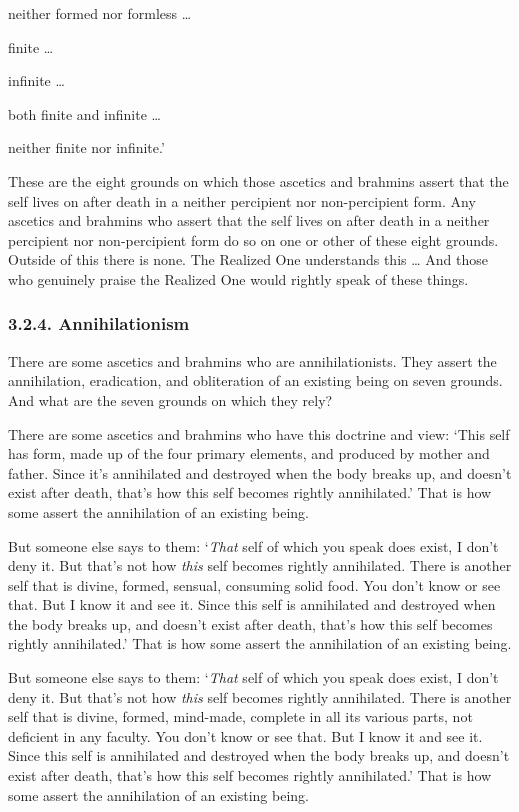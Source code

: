 \documentclass[12pt,openany]{book}%
\begin{document}
neither formed nor formless … 

finite … 

infinite … 

both finite and infinite … 

neither finite nor infinite.’ 

These are the eight grounds on which those ascetics and brahmins assert that the self lives on after death in a neither percipient nor non-percipient form. Any ascetics and brahmins who assert that the self lives on after death in a neither percipient nor non-percipient form do so on one or other of these eight grounds. Outside of this there is none. The Realized One understands this … And those who genuinely praise the Realized One would rightly speak of these things. 

\subsubsection*{3.2.4. Annihilationism }

There are some ascetics and brahmins who are annihilationists. They assert the annihilation, eradication, and obliteration of an existing being on seven grounds. And what are the seven grounds on which they rely? 

There are some ascetics and brahmins who have this doctrine and view: ‘This self has form, made up of the four primary elements, and produced by mother and father. Since it’s annihilated and destroyed when the body breaks up, and doesn’t exist after death, that’s how this self becomes rightly annihilated.’ That is how some assert the annihilation of an existing being. 

But someone else says to them: ‘\emph{That} self of which you speak does exist, I don’t deny it. But that’s not how \emph{this} self becomes rightly annihilated. There is another self that is divine, formed, sensual, consuming solid food. You don’t know or see that. But I know it and see it. Since this self is annihilated and destroyed when the body breaks up, and doesn’t exist after death, that’s how this self becomes rightly annihilated.’ That is how some assert the annihilation of an existing being. 

But someone else says to them: ‘\emph{That} self of which you speak does exist, I don’t deny it. But that’s not how \emph{this} self becomes rightly annihilated. There is another self that is divine, formed, mind-made, complete in all its various parts, not deficient in any faculty. You don’t know or see that. But I know it and see it. Since this self is annihilated and destroyed when the body breaks up, and doesn’t exist after death, that’s how this self becomes rightly annihilated.’ That is how some assert the annihilation of an existing being. 
\end{document}

